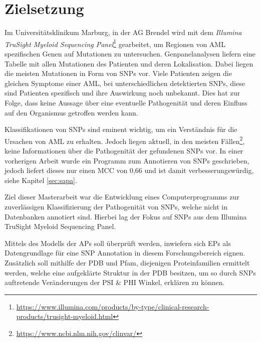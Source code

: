 \section{Zielsetzung}

Im Universitätsklinikum Marburg, in der AG Brendel wird mit dem \emph{Illumina TruSight Myeloid Sequencing Panel}\footnote{\url{https://www.illumina.com/products/by-type/clinical-research-products/trusight-myeloid.html}} gearbeitet, um Regionen von \ac{AML} spezifischen Genen auf Mutationen zu untersuchen. Genpanelanalysen liefern eine Tabelle mit allen Mutationen des Patienten und deren Lokalisation. Dabei liegen die meisten Mutationen in Form von \ac{SNP}s vor. Viele Patienten zeigen die gleichen Symptome einer \ac{AML}, bei unterschiedlichen detektierten \ac{SNP}s, diese sind Patienten spezifisch und ihre Auswirkung noch unbekannt. Dies hat zur Folge, dass keine Aussage über eine eventuelle Pathogenität und deren Einfluss auf den Organismus getroffen werden kann.

Klassifikationen von \ac{SNP}s sind eminent wichtig, um ein Verständnis für die Ursachen von \ac{AML} zu erhalten. Jedoch liegen aktuell, in den meisten Fällen\footnote{\url{https://www.ncbi.nlm.nih.gov/clinvar/}}, keine Informationen über die Pathogenität der gefundenen \ac{SNP}s vor. In einer vorherigen Arbeit wurde ein Programm zum Annotieren von \ac{SNP}s geschrieben, jedoch liefert dieses nur einen \ac{MCC} von 0,66 und ist damit verbesserungswürdig, siehe Kapitel \ref{sec:sapa}.

Ziel dieser Masterarbeit war die Entwicklung eines Computerprogramms zur zuverlässigen Klassifizierung der Pathogenität von SNPs, welche nicht in Datenbanken annotiert sind. Hierbei lag der Fokus auf \ac{SNP}s aus dem Illumina TruSight Myeloid Sequencing Panel.

Mittels des Modells der \ac{APs} soll überprüft werden, inwiefern sich \ac{EP}s als Datengrundlage für eine \ac{SNP} Annotation in diesem Forschungsbereich eignen. Zusätzlich soll mithilfe der \ac{PDB} und \ac{Pfam}, diejenigen Proteinfamilien ermittelt werden, welche eine aufgeklärte Struktur in der \ac{PDB} besitzen, um so durch \ac{SNP}s auftretende Veränderungen der PSI \& PHI Winkel, erklären zu können. 




